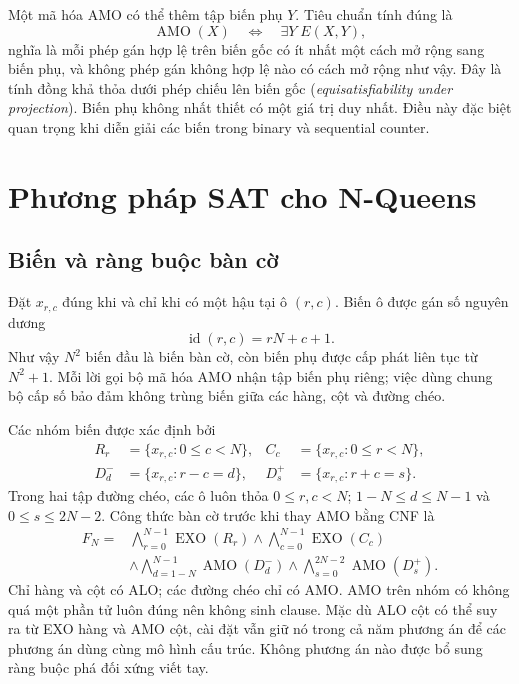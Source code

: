 Một mã hóa AMO có thể thêm tập biến phụ $Y$. Tiêu chuẩn tính đúng là
\begin{equation}
 \operatorname{AMO}(X)\quad\Longleftrightarrow\quad
 \exists Y\; E(X,Y),
 \label{eq:th-projection}
\end{equation}
nghĩa là mỗi phép gán hợp lệ trên biến gốc có ít nhất một cách mở rộng sang
biến phụ, và không phép gán không hợp lệ nào có cách mở rộng như vậy.
Đây là tính đồng khả thỏa dưới phép chiếu lên biến gốc
(\emph{equisatisfiability under projection}). Biến phụ không nhất thiết
có một giá trị duy nhất. Điều này đặc biệt quan trọng khi diễn giải các
biến trong binary và sequential counter.

\section{Phương pháp SAT cho N-Queens}
\label{sec:theory-method}

\subsection{Biến và ràng buộc bàn cờ}

Đặt $x_{r,c}$ đúng khi và chỉ khi có một hậu tại ô $(r,c)$. Biến ô được
gán số nguyên dương
\begin{equation}
 \operatorname{id}(r,c)=rN+c+1.
 \label{eq:th-id}
\end{equation}
Như vậy $N^2$ biến đầu là biến bàn cờ, còn biến phụ được cấp phát liên tục
từ $N^2+1$. Mỗi lời gọi bộ mã hóa AMO nhận tập biến phụ riêng; việc dùng
chung bộ cấp số bảo đảm không trùng biến giữa các hàng, cột và đường chéo.

Các nhóm biến được xác định bởi
\begin{align}
 R_r &= \{x_{r,c}:0\leq c<N\},
 &C_c &= \{x_{r,c}:0\leq r<N\},\\
 D^-_d &= \{x_{r,c}:r-c=d\},
 &D^+_s &= \{x_{r,c}:r+c=s\}.
\end{align}
Trong hai tập đường chéo, các ô luôn thỏa $0\leq r,c<N$;
$1-N\leq d\leq N-1$ và $0\leq s\leq 2N-2$.
Công thức bàn cờ trước khi thay AMO bằng CNF là
\begin{equation}
\begin{split}
 F_N={}&\bigwedge_{r=0}^{N-1}\operatorname{EXO}(R_r)
 \land\bigwedge_{c=0}^{N-1}\operatorname{EXO}(C_c)\\
 &\land\bigwedge_{d=1-N}^{N-1}\operatorname{AMO}(D^-_d)
 \land\bigwedge_{s=0}^{2N-2}\operatorname{AMO}(D^+_s).
\end{split}
\label{eq:th-board}
\end{equation}
Chỉ hàng và cột có ALO; các đường chéo chỉ có AMO. AMO trên nhóm có
không quá một phần tử luôn đúng nên không sinh clause. Mặc dù ALO cột có
thể suy ra từ EXO hàng và AMO cột, cài đặt vẫn giữ nó trong cả năm
phương án để các phương án dùng cùng mô hình cấu trúc. Không phương án
nào được bổ sung ràng buộc phá đối xứng viết tay.

